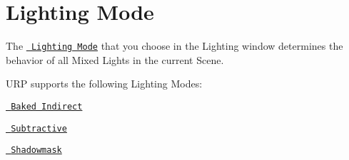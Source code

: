 \chapter{Lighting Mode}
\hypertarget{md__hey_tea_9_2_library_2_package_cache_2com_8unity_8render-pipelines_8universal_0d14_80_88_2_doa8d81e8f648d2c50e81d659228f25d86}{}\label{md__hey_tea_9_2_library_2_package_cache_2com_8unity_8render-pipelines_8universal_0d14_80_88_2_doa8d81e8f648d2c50e81d659228f25d86}
\label{md__hey_tea_9_2_library_2_package_cache_2com_8unity_8render-pipelines_8universal_0d14_80_88_2_doa8d81e8f648d2c50e81d659228f25d86_autotoc_md2643}%
%
 The \href{https://docs.unity3d.com/Manual/lighting-mode.html}{\texttt{ Lighting Mode}} that you choose in the Lighting window determines the behavior of all Mixed Lights in the current Scene.

URP supports the following Lighting Modes\+:


\begin{DoxyItemize}
\item \href{https://docs.unity3d.com/Manual/LightMode-Mixed-BakedIndirect.html}{\texttt{ Baked Indirect}}
\item \href{https://docs.unity3d.com/Manual/LightMode-Mixed-Subtractive.html}{\texttt{ Subtractive}}
\item \href{https://docs.unity3d.com/Manual/LightMode-Mixed-Shadowmask.html}{\texttt{ Shadowmask}} 
\end{DoxyItemize}